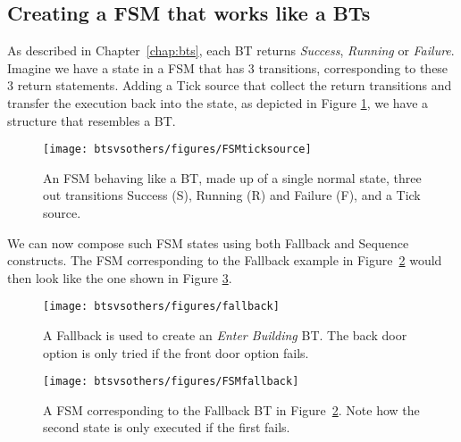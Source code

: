 \newpage
\subsection{Creating a FSM that works like a BTs }
\label{btsvsothers:sec:FSMandBTs}


As described in Chapter~\ref{chap:bts}, each BT returns \emph{Success}, \emph{Running} or \emph{Failure}.
Imagine we have a state in a FSM that has 3 transitions, corresponding to these 3 return statements.
Adding a Tick source that collect the return transitions and transfer the execution back into the state, as depicted in Figure \ref{btsvsothers:FSMticksource}, we have a structure that resembles a BT.

 \begin{figure}[h]
\begin{center}
\texttt{[image: btsvsothers/figures/FSMticksource]}
\caption{An FSM behaving like a BT, made up of a single normal state, three out transitions Success (S), Running (R) and Failure (F), and a Tick source. }
\label{btsvsothers:FSMticksource}
\end{center}
\end{figure}




We can now compose such FSM states using both Fallback and Sequence constructs. The FSM corresponding to the Fallback example in Figure~\ref{btsvsothers:subsumption} would then look like the one shown in Figure \ref{btsvsothers:FSMfallback}.

\begin{figure}[h]
\begin{center}
\texttt{[image: btsvsothers/figures/fallback]}
\caption{
A Fallback is used to create an \emph{Enter Building} BT.
The back door option is only tried if the front door option fails. }
\label{btsvsothers:subsumption}
\end{center}
\end{figure}


 \begin{figure}[h]
\begin{center}
\centering
\texttt{[image: btsvsothers/figures/FSMfallback]}
\caption{A FSM corresponding to the Fallback BT in Figure~\ref{btsvsothers:subsumption}.
Note how the second state is only executed if the first fails.}
\label{btsvsothers:FSMfallback}
\end{center}
\end{figure}

